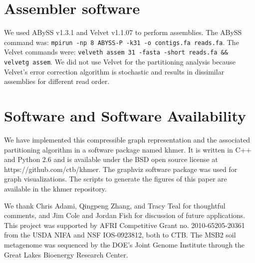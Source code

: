 \documentclass{pnastwo}
\begin{document}
\begin{article}
\begin{materials}
\section{Assembler software}

We used ABySS v1.3.1 and Velvet v1.1.07 to perform assemblies.
The ABySS command was: {\tt mpirun -np 8 ABYSS-P -k31 -o contigs.fa reads.fa}.
The Velvet commands were: {\tt velveth assem 31 -fasta -short reads.fa \&\& velvetg assem}.
We did not use Velvet for the partitioning analysis because Velvet's
error correction algorithm is stochastic and results in dissimilar
assemblies for different read order.

\section{Software and Software Availability}

We have implemented this compressible graph representation and the associated
partitioning algorithm in a
software package named khmer.  It is written in C++ and Python 2.6 and
is available under the BSD open source license at
https://github.com/ctb/khmer.  The graphviz software package was used
for graph visualizations. The scripts to generate the figures of this
paper are available in the khmer repository.

\end{materials}

\begin{acknowledgments}

We thank Chris Adami, Qingpeng Zhang, and Tracy Teal for
thoughtful comments, and Jim Cole and Jordan Fish for discussion of future
applications.  This project was supported by AFRI Competitive Grant
no. 2010-65205-20361 from the USDA NIFA and NSF IOS-0923812, both to CTB.  The
MSB2 soil metagenome was sequenced by the DOE's Joint Genome
Institute through the Great Lakes Bioenergy Research Center.

\end{acknowledgments}


%

%

\begin{thebibliography}{10}



\end{thebibliography}
\end{article}
\end{document}
